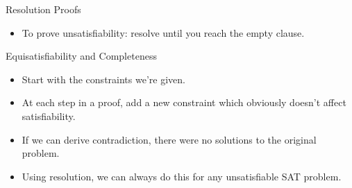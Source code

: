 \documentclass{beamer}
\begin{document}
\begin{frame}{Resolution Proofs}
{    \begin{itemize}
        \item To prove unsatisfiability: resolve until you reach the empty clause.
    \end{itemize}
}
\end{frame}

\begin{frame}{Equisatisfiability and Completeness}
    \begin{itemize}
        \item Start with the constraints we're given.
        \item At each step in a proof, add a new constraint which obviously doesn't affect satisfiability.
        \item If we can derive contradiction, there were no solutions to the original problem.
        \item Using resolution, we can always do this for any unsatisfiable SAT problem.
    \end{itemize}
\end{frame}
\end{document}
